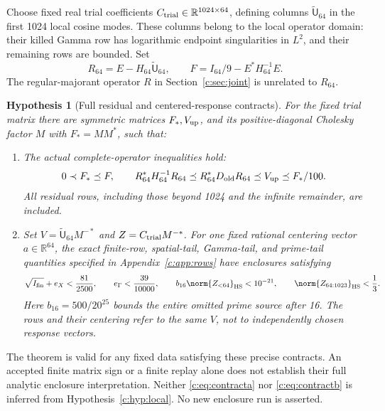 \documentclass[11pt,a4paper]{article}
\numberwithin{equation}{section}
\newtheorem{hypothesis}[theorem]{Hypothesis}
\theoremstyle{definition}\newtheorem{definition}[theorem]{Definition}
\theoremstyle{remark}\newtheorem{remark}[theorem]{Remark}
\newcommand{\R}{\mathbb R}\newcommand{\C}{\mathbb C}\newcommand{\N}{\mathbb N}
\begin{document}
Choose fixed real trial coefficients $C_{\rm trial}\in\R^{1024\times64}$,
defining columns $\widetilde{\mathsf U}_{64}$ in the first 1024 local cosine modes.
These columns belong to the local operator domain: their killed Gamma row has logarithmic endpoint singularities in $L^2$, and their remaining rows are bounded.
Set
\[
 R_{64}=E-H_{64}\widetilde{\mathsf U}_{64},\qquad
 F=I_{64}/9-E^*H_{64}^{-1}E.
\]
The regular-majorant operator $R$ in Section~\ref{c:sec:joint} is unrelated to $R_{64}$.

\begin{hypothesis}[Full residual and centered-response contracts]\label{c:hyp:response}
For the fixed trial matrix there are symmetric matrices $F_*,V_{\rm up}$,
and its positive-diagonal Cholesky factor $M$ with $F_*=MM^*$, such that:
\begin{enumerate}[label=\textup{(\alph*)}]
\item The actual complete-operator inequalities hold:
\begin{equation}\label{c:eq:contracta}
 0\prec F_*\preceq F,\qquad
 R_{64}^*H_{64}^{-1}R_{64}
 \preceq R_{64}^*D_{\rm old}R_{64}
 \preceq V_{\rm up}\preceq F_*/100.
\end{equation}
All residual rows, including those beyond 1024 and the infinite remainder, are included.
\item Set $V=\widetilde{\mathsf U}_{64} M^{-*}$ and $Z=C_{\rm trial}M^{-*}$.
For one fixed rational centering vector $a\in\R^{64}$, the exact finite-row, spatial-tail, Gamma-tail, and prime-tail quantities specified in Appendix~\ref{c:app:rows} have enclosures satisfying
\begin{equation}\label{c:eq:contractb}
 \sqrt{I_{\rm fin}}+e_X<\frac{81}{2500},\qquad
 e_\Gamma<\frac{39}{10000},\qquad
 b_{16}\norm{Z_{<64}}_{\mathrm{HS}}<10^{-21},\qquad
 \norm{Z_{64:1023}}_{\mathrm{HS}}<\frac13.
\end{equation}
Here $b_{16}=500/20^{25}$ bounds the entire omitted prime source after 16.
The rows and their centering refer to the same $V$, not to independently chosen response vectors.
\end{enumerate}
\end{hypothesis}
The theorem is valid for any fixed data satisfying these precise contracts.
An accepted finite matrix sign or a finite replay alone does not establish their full analytic enclosure interpretation.
Neither \eqref{c:eq:contracta} nor \eqref{c:eq:contractb} is inferred from Hypothesis~\ref{c:hyp:local}.
No new enclosure run is asserted.
\end{document}
